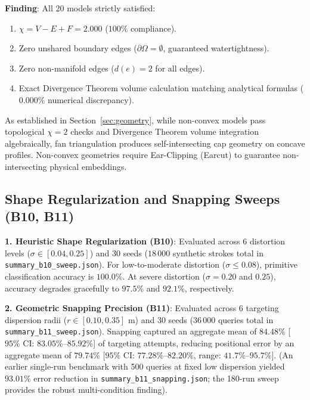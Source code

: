\textbf{Finding}: All 20 models strictly satisfied:
\begin{enumerate}
    \item $\chi = V - E + F = 2.000$ ($100\%$ compliance).
    \item Zero unshared boundary edges ($\partial \Omega = \emptyset$, guaranteed watertightness).
    \item Zero non-manifold edges ($d(e) = 2$ for all edges).
    \item Exact Divergence Theorem volume calculation matching analytical formulas ($0.000\%$ numerical discrepancy).
\end{enumerate}
As established in Section~\ref{sec:geometry}, while non-convex models pass topological $\chi=2$ checks and Divergence Theorem volume integration algebraically, fan triangulation produces self-intersecting cap geometry on concave profiles. Non-convex geometries require Ear-Clipping (Earcut) to guarantee non-intersecting physical embeddings.

\subsection{Shape Regularization and Snapping Sweeps (B10, B11)}
\textbf{1. Heuristic Shape Regularization (B10)}: Evaluated across 6 distortion levels ($\sigma \in [0.04, 0.25]$) and 30 seeds ($18\,000$ synthetic strokes total in \texttt{summary\_b10\_sweep.json}). For low-to-moderate distortion ($\sigma \le 0.08$), primitive classification accuracy is $100.0\%$. At severe distortion ($\sigma = 0.20$ and $0.25$), accuracy degrades gracefully to $97.5\%$ and $92.1\%$, respectively.

\textbf{2. Geometric Snapping Precision (B11)}: Evaluated across 6 targeting dispersion radii ($r \in [0.10, 0.35]\text{ m}$) and 30 seeds ($36\,000$ queries total in \texttt{summary\_b11\_sweep.json}). Snapping captured an aggregate mean of $84.48\%$ [$95\%$ CI: $83.05\%$–$85.92\%$] of targeting attempts, reducing positional error by an aggregate mean of $79.74\%$ [$95\%$ CI: $77.28\%$–$82.20\%$, range: $41.7\%$–$95.7\%$]. (An earlier single-run benchmark with 500 queries at fixed low dispersion yielded $93.01\%$ error reduction in \texttt{summary\_b11\_snapping.json}; the 180-run sweep provides the robust multi-condition finding).

